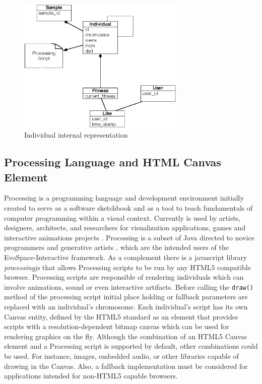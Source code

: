\documentclass{llncs}
\begin{document}
\begin{figure}[t]
    \centering
        \includegraphics[width=8cm]{UMLIndividual.eps}
    \caption{Individual internal representation }
    \label{fig:individual}
\end{figure}

\subsection{Processing Language and HTML Canvas Element}
Processing is a programming language and development environment initially created to serve as a software sketchbook and as a tool to teach fundamentals
of computer programming within a visual context.
Currently is used by artists, designers, architects, and researchers for visualization applications, games and interactive animations projects \cite{Reas:2007wp}.
Processing is a subset of Java directed to novice programmers and generative artists \cite{Pearson:2011ti}, which are the intended users of the EvoSpace-Interactive framework.
As a complement there is a javascript library \emph{processingjs} that allows Processing scripts to be run by any HTML5 compatible browser.
Processing scripts are responsible of rendering individuals which can involve animations, sound or even interactive artifacts.
Before calling the \texttt{draw()} method of the processing script initial place holding or fallback parameters are replaced with an individual's chromosome.
Each individual's script has its own Canvas entity, defined by the HTML5 standard as an element that provides scripts with a resolution-dependent bitmap canvas
which can be used for rendering graphics on the fly.
Although the combination of an HTML5 Canvas element and a Processing script is supported by default, other combinations could be used.
For instance, images, embedded audio, or other libraries capable of drawing in the Canvas.
Also, a fallback implementation must be considered for applications intended for non-HTML5 capable browsers.
\end{document}
